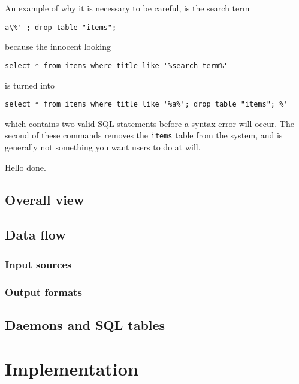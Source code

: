 An example of why it is necessary to be careful, is the search term
\begin{verbatim}
a\%' ; drop table "items";
\end{verbatim}

because the innocent looking

\begin{verbatim}
select * from items where title like '%search-term%'
\end{verbatim}

is turned into
\begin{verbatim}
select * from items where title like '%a%'; drop table "items"; %'
\end{verbatim}
which contains two valid SQL-statements before a syntax error will
occur.  The second of these commands removes the \texttt{items} table
from the system, and is generally not something you want users to do
at will.



Hello done.
\section{Overall view}
\label{sec:cactus-overall-view}

\section{Data flow}
\label{sec:cactus-data-flow}

\subsection{Input sources}

\subsection{Output formats}

\section{Daemons and SQL tables}
\label{sec:cactus-daemons-and-sql-tables}


\chapter{Implementation}


